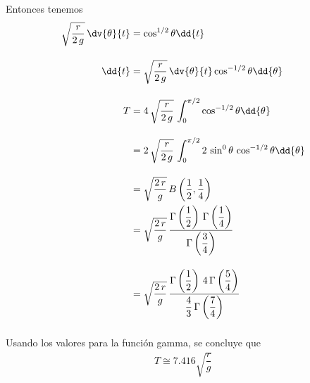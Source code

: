 Entonces tenemos
\begin{align*}
\sqrt{\dfrac{r}{2 \, g}} \, \dv{\theta}{t} &= \cos^{1/2} \theta
\dd{t} \\[1em]
\dd{t} &= \sqrt{\dfrac{r}{2 \, g}} \, \dv{\theta}{t} \cos^{-1/2} \theta \dd{\theta} \\[1em]
T &= 4 \, \sqrt{\dfrac{r}{2 \, g}} \, \int_{0}^{\pi/2} \cos^{-1/2} \theta \dd{\theta} \\[1em]
&= 2 \, \sqrt{\dfrac{r}{2 \, g}} \, \int_{0}^{\pi/2} 2 \, \sin^{0} \theta \, \cos^{-1/2} \theta \dd{\theta} \\[1em]
&= \sqrt{\dfrac{2 \, r}{g}} \, B \left( \dfrac{1}{2}, \dfrac{1}{4} \right) \\
&= \sqrt{\dfrac{2 \, r}{g}} \, \dfrac{\Gamma \left(\dfrac{1}{2} \right) \, \Gamma \left(\dfrac{1}{4} \right)}{\Gamma \left(\dfrac{3}{4} \right)} \\[1em]
&= \sqrt{\dfrac{2 \, r}{g}} \, \dfrac{\Gamma \left(\dfrac{1}{2} \right) \, 4 \, \Gamma \left(\dfrac{5}{4} \right)}{\dfrac{4}{3} \, \Gamma \left(\dfrac{7}{4} \right)} \\[1em]
\end{align*}
Usando los valores para la función gamma, se concluye que
\begin{align*}
T \cong 7.416 \sqrt{\dfrac{r}{g}}
\end{align*}
